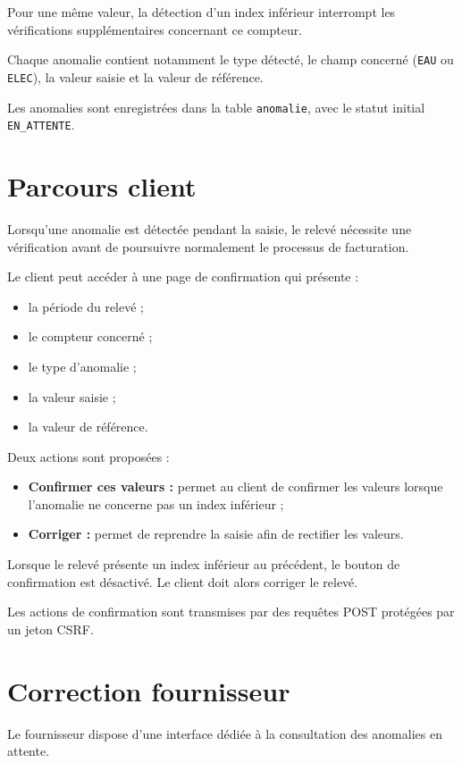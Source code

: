 Pour une même valeur, la détection d'un index inférieur interrompt les vérifications supplémentaires concernant ce compteur.

Chaque anomalie contient notamment le type détecté, le champ concerné (\texttt{EAU} ou \texttt{ELEC}), la valeur saisie et la valeur de référence.

Les anomalies sont enregistrées dans la table \texttt{anomalie}, avec le statut initial \texttt{EN\_ATTENTE}.

\section{Parcours client}

Lorsqu'une anomalie est détectée pendant la saisie, le relevé nécessite une vérification avant de poursuivre normalement le processus de facturation.

Le client peut accéder à une page de confirmation qui présente :
\begin{itemize}
    \item la période du relevé ;
    \item le compteur concerné ;
    \item le type d'anomalie ;
    \item la valeur saisie ;
    \item la valeur de référence.
\end{itemize}

Deux actions sont proposées :
\begin{itemize}
    \item \textbf{Confirmer ces valeurs :} permet au client de confirmer les valeurs lorsque l'anomalie ne concerne pas un index inférieur ;
    \item \textbf{Corriger :} permet de reprendre la saisie afin de rectifier les valeurs.
\end{itemize}

Lorsque le relevé présente un index inférieur au précédent, le bouton de confirmation est désactivé. Le client doit alors corriger le relevé.

Les actions de confirmation sont transmises par des requêtes POST protégées par un jeton CSRF.

\section{Correction fournisseur}

Le fournisseur dispose d'une interface dédiée à la consultation des anomalies en attente.

